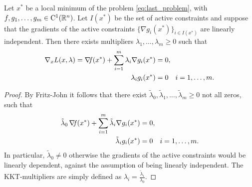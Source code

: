 \documentclass[10pt,a4paper]{article}
\begin{document}
\begin{theorem}
	Let $x^*$ be a local minimum of the problem \eqref{eq:last_problem}, with $f, g_1,\dots, g_m\in \mathord{\mathrm{C^1}}(\mathbb{R}^n)$. Let $I(x^*)$ be the set of active constraints and suppose that the gradients of the active constraints $\{\nabla g_i(x^*)\}_{i\in I(x^*)}$ are linearly independent. Then there exists multipliers $\lambda_1, \dots, \lambda_m\geq 0$ such that 
	\begin{equation}\label{eq:kkt}
		\begin{split}
			\nabla_x L(x,\lambda) = \operatorname*{\mathit{\nabla \!f}}(x^*)+ \sum_{i=1}^{m} \lambda_i \nabla g_i(x^*) &= 0,\\
			\lambda_ig_i(x^*)&=0 \quad i=1, \dots, m.
		\end{split}
	\end{equation}
\end{theorem}
\begin{proof}
	By Fritz-John it follows that there exist $\tilde{\lambda}_0, \tilde{\lambda}_1, \dots, \tilde{\lambda}_m\geq 0$ not all zeros, such that \begin{equation*}
		\begin{split}
			\tilde{\lambda}_0\operatorname*{\mathit{\nabla \!f}}(x^*)+ \sum_{i=1}^{m} \tilde{\lambda}_i \nabla g_i(x^*) &= 0,\\
			\tilde{\lambda}_ig_i(x^*)&=0 \quad i=1, \dots, m.
		\end{split}
	\end{equation*}
In particular, $\tilde{\lambda}_0\neq0$ otherwise the gradients of the active constraints would be linearly dependent, against the assumption of being linearly independent. The KKT-multipliers are simply defined as $\lambda_i=\frac{\tilde{\lambda}_i}{\lambda_0}$.
\end{proof}
\end{document}
